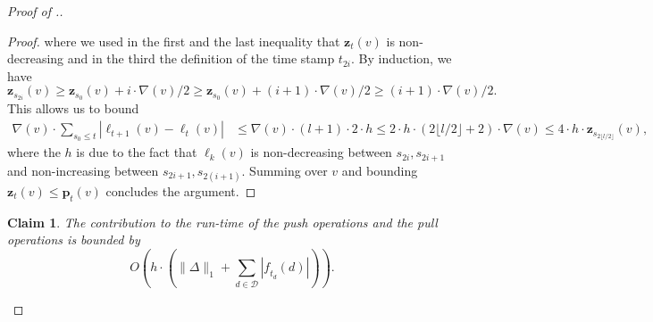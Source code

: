 \documentclass[11pt]{article}
\newtheorem{claim}[theorem]{Claim}
\newcommand\bell{\boldsymbol{\mathit{\ell}}}
\newcommand\ff{\boldsymbol{\mathit{f}}}
\begin{document}
\begin{proof}[Proof of .]
\begin{proof}
    where we used in the first and the last inequality that $\textbf{z}_t(v)$ is non-decreasing and in the third the definition of the time stamp $t_{2i}$. By induction, we have $\textbf{z}_{s_{2i}}(v) \geq \textbf{z}_{s_{0}}(v) + i \cdot \nabla(v)/2 \geq \textbf{z}_{s_{0}}(v) + (i + 1) \cdot \nabla(v)/2 \geq (i + 1) \cdot \nabla(v)/2.$ This allows us to bound
    \begin{align*}
        \nabla(v) \cdot \sum_{s_0 \leq t} |\bell_{t+1}(v) - \bell_{t}(v)| &\leq \nabla(v) \cdot (l + 1) \cdot 2 \cdot h \leq 2 \cdot h \cdot (2 \lfloor l/2 \rfloor + 2) \cdot \nabla(v) \leq 4 \cdot h \cdot \textbf{z}_{s_{2\lfloor l/2 \rfloor}}(v), 
    \end{align*}
    where the $h$ is due to the fact that $\bell_k(v)$ is non-decreasing between $s_{2i}, s_{2i + 1}$ and non-increasing between $s_{2i + 1}, s_{2(i+1)}$. Summing over $v$ and bounding $\textbf{z}_t(v) \leq \textbf{p}_t(v)$ concludes the argument.
\end{proof}
\begin{claim}\label{proof:LmPushPullRelabel-cl3} 
    The contribution to the run-time of the push operations and the pull operations is bounded by 
    \[O\left(h \cdot \left( \|\Delta\|_1 + \sum_{d \in \mathcal{D}} |\ff_{t_d}(d)| \right) \right).\]
\end{claim}


\end{proof}
\end{document}
